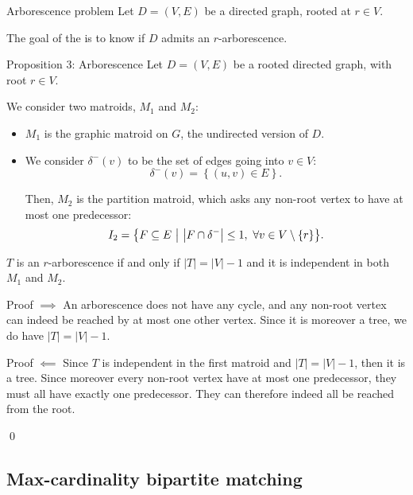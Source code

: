 \documentclass[a4paper]{article}
\begin{document}
\begin{parag}{Arborescence problem}
    Let $D = \left(V, E\right)$ be a directed graph, rooted at $r \in V$.

    The goal of the  is to know if $D$ admits an $r$-arborescence.
\end{parag}

\begin{parag}{Proposition 3: Arborescence}
    Let $D = \left(V, E\right)$ be a rooted directed graph, with root $r \in V$.

    We consider two matroids, $M_1$ and $M_2$:
    \begin{itemize}[left=0pt]
        \item $M_1$ is the graphic matroid on $G$, the undirected version of $D$.
        \item We consider $\delta^{-}\left(v\right)$ to be the set of edges going into $v \in V$:
        \[\delta^-\left(v\right) = \left\{\left(u, v\right) \in E\right\}.\]

            Then, $M_2$ is the partition matroid, which asks any non-root vertex to have at most one predecessor: 
        \[I_2 = \left\{F \subseteq E \suchthat \left|F \cap \delta^{-}\right| \leq 1, \ \forall v \in V \setminus \left\{r\right\}\right\}.\]
    \end{itemize}
    
    $T$ is an $r$-arborescence if and only if $\left|T\right| = \left|V\right|-1$ and it is independent in both $M_1$ and $M_2$.

    \begin{subparag}{Proof $\implies$}
        An arborescence does not have any cycle, and any non-root vertex can indeed be reached by at most one other vertex. Since it is moreover a tree, we do have $\left|T\right| = \left|V\right| - 1$.
    \end{subparag}

    \begin{subparag}{Proof $\impliedby$}
        Since $T$ is independent in the first matroid and $\left|T\right| = \left|V\right|-1$, then it is a tree. Since moreover every non-root vertex have at most one predecessor, they must all have exactly one predecessor. They can therefore indeed all be reached from the root.

        \qed
    \end{subparag}
\end{parag}

\subsection{Max-cardinality bipartite matching}
\end{document}
